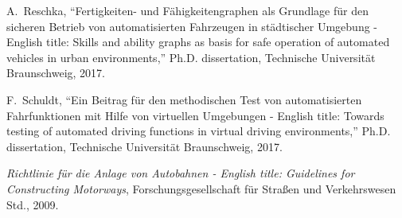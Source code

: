 \documentclass[conference]{IEEEtranch}
\begin{document}
\begin{thebibliography}{10}
	A.~Reschka, ``{Fertigkeiten- und F\"ahigkeitengraphen als Grundlage f\"ur den
		sicheren Betrieb von automatisierten Fahrzeugen in st\"adtischer Umgebung -
		English title: Skills and ability graphs as basis for safe operation of
		automated vehicles in urban environments},'' Ph.D. dissertation, Technische
	Universit{\"a}t Braunschweig, 2017.
	
	F.~Schuldt, ``{Ein Beitrag f\"ur den methodischen Test von automatisierten
		Fahrfunktionen mit Hilfe von virtuellen Umgebungen - English title: Towards
		testing of automated driving functions in virtual driving environments},''
	Ph.D. dissertation, Technische Universit{\"a}t Braunschweig, 2017.
	
	\emph{Richtlinie f\"ur die Anlage von Autobahnen - English title: Guidelines
		for Constructing Motorways}, Forschungsgesellschaft f\"ur Stra{\ss}en und
	Verkehrswesen Std., 2009.
	
\end{thebibliography}

\end{document}
